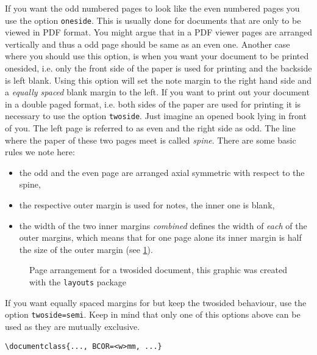 If you want the odd numbered pages to look like the even numbered pages you use the option 
\lstinline[language={[LaTeX]TeX}]|oneside|. This is usually done for documents that are only 
to be viewed in PDF format. You might argue that in a PDF viewer pages are arranged 
vertically  and thus a odd page should be same as an even one. Another case where you 
should use this option, is when you want your document to be printed onesided, i.e. only 
the front side of the paper is used for printing and the backside is left blank. Using 
this option will set the note margin to the right hand side and a \emph{equally spaced} blank 
margin to the left. If you want to print out your
document in a double paged format, i.e. both sides of the paper are used for printing it is
necessary to use the option \lstinline[language={[LaTeX]TeX}]|twoside|. Just imagine an 
opened book lying in front of you. The left page is referred to as even and the right side 
as odd. The line where the paper of these two pages meet is called \emph{spine}. 
There are some basic rules we note here:
\begin{itemize}
\item the odd and the even page are arranged axial symmetric with respect to the spine,
\item the respective outer margin is used for notes, the inner one is blank, 
\item the width of the two inner margins \emph{combined} defines the width of \emph{each} 
of the outer margins, which means that for one page alone its inner margin is half the 
size of the outer margin (see \cref{fig:twosided}).
\end{itemize}
\begin{figure}
\newlength{\pwlay}
\setlength{\pwlay}{0.4375\textwidth}
\caption{Page arrangement for a twosided document, this graphic was created with the 
		\texttt{layouts} package} \label{fig:twosided}
\end{figure}
If you want equally spaced margins for but keep the twosided behaviour, use the option
\lstinline[language={[LaTeX]TeX}]|twoside=semi|. Keep in mind that only one of this options 
above can be used as they are mutually exclusive.
\begin{emphBox}
\lstinline[language={[LaTeX]TeX}]|\documentclass{..., BCOR=<w>mm, ...}|
\end{emphBox}
